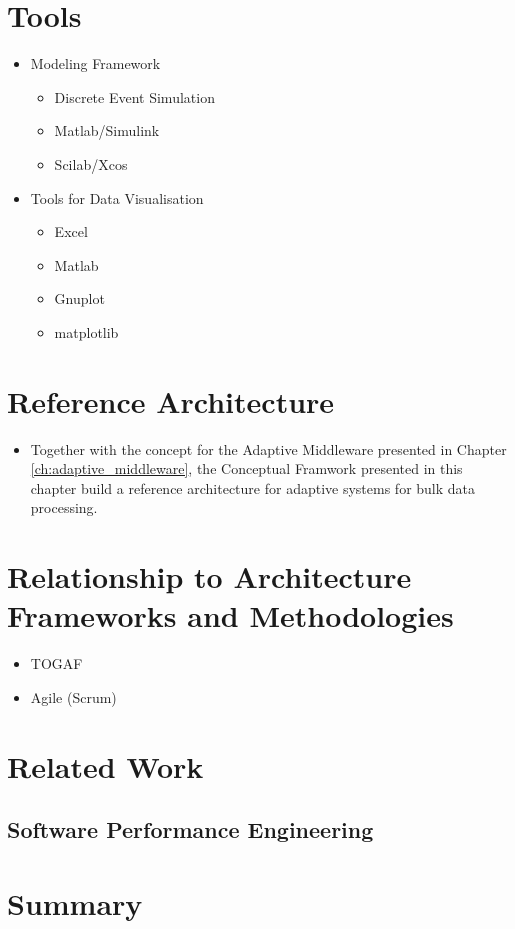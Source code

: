 \section{Tools} %
\label{sec:ch6_tools}

\begin{itemize}
	\item Modeling Framework
	\begin{itemize}
		\item Discrete Event Simulation
		\item Matlab/Simulink
		\item Scilab/Xcos
	\end{itemize}
	\item Tools for Data Visualisation
	\begin{itemize}
		\item Excel
		\item Matlab
		\item Gnuplot
		\item matplotlib
	\end{itemize}
\end{itemize}


\section{Reference Architecture}

\begin{itemize}
	\item Together with the concept for the Adaptive Middleware presented in Chapter \ref{ch:adaptive_middleware}, the Conceptual Framwork presented in this chapter build a reference architecture for adaptive systems for bulk data processing.
\end{itemize}

\section{Relationship to Architecture Frameworks and Methodologies} %
\label{sec:ch6_relation_frameworks}

\begin{itemize}
	\item TOGAF
	\item Agile (Scrum)
\end{itemize}


\section{Related Work}

\subsection{Software Performance Engineering} %
\label{sub:software_performance_engineering}


\section{Summary} 
